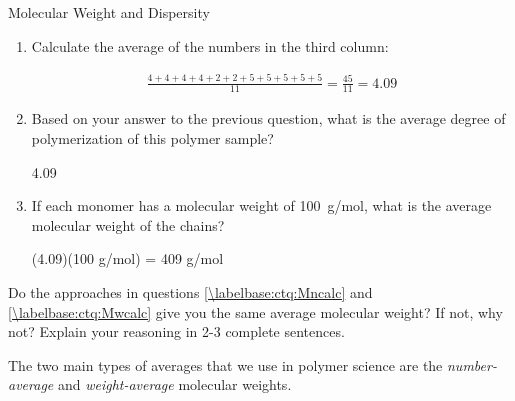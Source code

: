 \begin{activity}{Molecular Weight and Dispersity}
\begin{ctqs}
\begin{enumerate}
			\item Calculate the average of the numbers in the third column:
			
				\begin{solution}[1.5in]
				
					\begin{align*}
						\frac{4+4+4+4+2+2+5+5+5+5+5}{11} = \frac{45}{11} = 4.09
					\end{align*}
				
				\end{solution}
			
			\item Based on your answer to the previous question, what is the average degree of polymerization of this polymer sample?
			
				\begin{solution}[0.75in]
					4.09
				\end{solution}
				
			\item If each monomer has a molecular weight of 100~g/mol, what is the average molecular weight of the chains?
			
				\begin{solution}[1in]
					(4.09)(100 g/mol) = 409 g/mol
				\end{solution}
				
		\end{enumerate}
		
	\question Do the approaches in questions \ref{\labelbase:ctq:Mncalc} and \ref{\labelbase:ctq:Mwcalc} give you the same average molecular weight?  If not, why not?  Explain your reasoning in 2-3 complete sentences.
	
		\begin{solution}[3.25in]\end{solution}
		
\end{ctqs}

\begin{infobox}
\label{\labelbase:infobox:MnMw}
	
	The two main types of averages that we use in polymer science are the \emph{number-average} and \emph{weight-average} molecular weights.
	

\end{infobox}
\end{activity}
